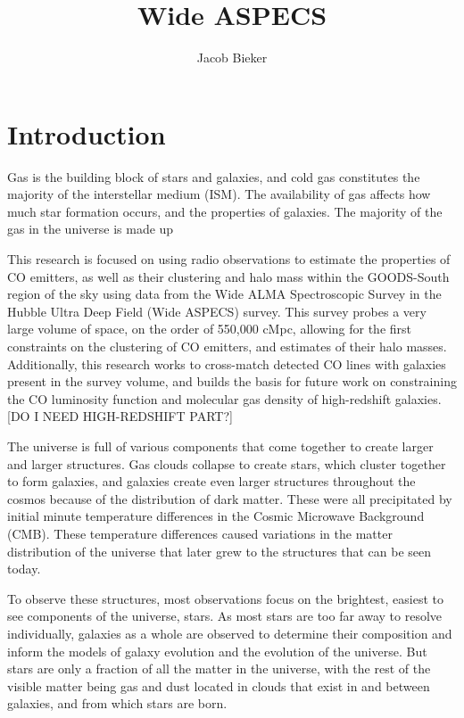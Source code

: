 \documentclass[twoside,single]{lion-msc}
\title{Wide ASPECS}
\author{Jacob Bieker}
\affiliation{Leiden Observatory, Leiden University}
\begin{document}
\maketitle

\tableofcontents
\cleardoublepage

\chapter{Introduction}

Gas is the building block of stars and galaxies, and cold gas constitutes the majority of the interstellar medium (ISM). The availability of gas affects how much star formation occurs, and the properties of galaxies. The majority of the gas in the universe is made up  

This research is focused on using radio observations to estimate the properties of CO emitters, as well as their clustering and halo mass within the GOODS-South region of the sky using data from the Wide ALMA Spectroscopic Survey in the Hubble Ultra Deep Field (Wide ASPECS) survey. This survey probes a very large volume of space, on the order of 550,000 cMpc, allowing for the first constraints on the clustering of CO emitters, and estimates of their halo masses. Additionally, this research works to cross-match detected CO lines with galaxies present in the survey volume, and builds the basis for future work on constraining the CO luminosity function and molecular gas density of high-redshift galaxies. [DO I NEED HIGH-REDSHIFT PART?]

The universe is full of various components that come together to create larger and larger structures. Gas clouds collapse to create stars, which cluster together to form galaxies, and galaxies create even larger structures throughout the cosmos because of the distribution of dark matter. These were all precipitated by initial minute temperature differences in the Cosmic Microwave Background (CMB). These temperature differences caused variations in the matter distribution of the universe that later grew to the structures that can be seen today. 

To observe these structures, most observations focus on the brightest, easiest to see components of the universe, stars.  As most stars are too far away to resolve individually, galaxies as a whole are observed to determine their composition and inform the models of galaxy evolution and the evolution of the universe. But stars are only a fraction of all the matter in the universe, with the rest of the visible matter being gas and dust located in clouds that exist in and between galaxies, and from which stars are born. 
\end{document}
